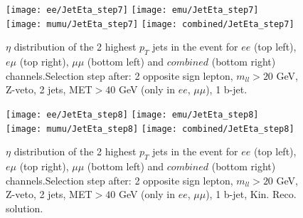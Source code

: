 \clearpage
\newpage

\begin{figure}
  \texttt{[image: ee/JetEta\_step7]}
  \texttt{[image: emu/JetEta\_step7]}\\
  \texttt{[image: mumu/JetEta\_step7]}
  \texttt{[image: combined/JetEta\_step7]}
\caption{$\eta$ distribution of the 2 highest $p_T$ jets in the event for $ee$ (top left), $e\mu$ (top right), $\mu\mu$ (bottom left) and $combined$ (bottom right) channels.\newline Selection step after: 2 opposite sign lepton, $m_{ll}>20$ GeV, Z-veto, 2 jets, MET$>40$ GeV (only in $ee$, $\mu\mu$), 1 b-jet.}
\end{figure}

\clearpage
\newpage


\begin{figure}
  \texttt{[image: ee/JetEta\_step8]}
  \texttt{[image: emu/JetEta\_step8]}\\
  \texttt{[image: mumu/JetEta\_step8]}
  \texttt{[image: combined/JetEta\_step8]}
\caption{$\eta$ distribution of the 2 highest $p_T$ jets in the event for $ee$ (top left), $e\mu$ (top right), $\mu\mu$ (bottom left) and $combined$ (bottom right) channels.\newline Selection step after: 2 opposite sign lepton, $m_{ll}>20$ GeV, Z-veto, 2 jets, MET$>40$ GeV (only in $ee$, $\mu\mu$), 1 b-jet, Kin. Reco. solution.}
\end{figure}

